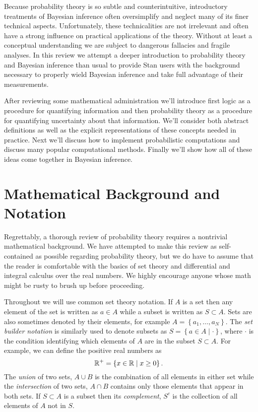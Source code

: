 Because probability theory is so subtle and counterintuitive, introductory 
treatments of Bayesian inference often oversimplify and neglect many 
of its finer technical aspects.  Unfortunately, these technicalities are not
irrelevant and often have a strong influence on practical applications of 
the theory.  Without at least a conceptual understanding we are subject 
to dangerous fallacies and fragile analyses.  In this review we attempt a 
deeper introduction to probability theory and Bayesian inference than usual 
to provide Stan users with the background necessary to properly wield 
Bayesian inference and take full advantage of their measurements.

After reviewing some mathematical administration we'll introduce first logic
as a procedure for quantifying information and then probability theory as a 
procedure for quantifying uncertainty about that information.  We'll consider 
both abstract definitions as well as the explicit representations of these concepts 
needed in practice.  Next we'll discuss how to implement probabilistic computations 
and discuss many popular computational methods.  Finally we'll show how all 
of these ideas come together in Bayesian inference.

\section{Mathematical Background and Notation}

Regrettably, a thorough review of probability theory requires a nontrivial
mathematical background.  We have attempted to make this review as
self-contained as possible regarding probability theory, but we do have to 
assume that the reader is comfortable with the basics of set theory and
differential and integral calculus over the real numbers.  We highly encourage 
anyone whose math might be rusty to brush up before proceeding.

Throughout we will use common set theory notation.  If $A$ is a set
then any element of the set is written as $a \in A$ while a subset is written
as $S \subset A$.  Sets are also sometimes denoted by their elements, for
example $A = \left\{ a_{1}, \ldots, a_{N} \right\}$.  The \emph{set builder
notation} is similarly used to denote subsets as 
$S = \left\{ a \in A \mid \cdot \right\}$, where $\cdot$ is the condition identifying
which elements of $A$ are in the subset $S \subset A$.  For example, we
can define the positive real numbers as 
%
\begin{equation*}
\mathbb{R}^{+} = \left\{ x \in \mathbb{R} \mid x \ge 0 \right\}.
\end{equation*}
%
The \emph{union} of two sets, $A \cup B$ is the combination of all 
elements in either set while the \emph{intersection} of two sets, 
$A \cap B$ contains only those elements that appear in both sets.
If $S \subset A$ is a subset then its \emph{complement}, $S^{c}$ is 
the collection of all elements of $A$ not in $S$.

